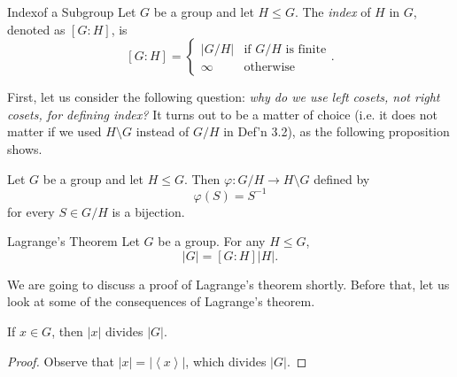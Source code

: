 \documentclass[pmath347]{subfiles}
\begin{document}
    \begin{definition}{Index}{of a Subgroup}
        Let $G$ be a group and let $H\leq G$. The \emph{index} of $H$ in $G$, denoted as $\left[ G:H \right]$, is
        \begin{equation*}
            \left[ G:H \right] = 
            \begin{cases} 
                \left| G /H \right|  & \text{if }G /H \text{ is finite} \\
                \infty & \text{otherwise}
            \end{cases}.
        \end{equation*}
    \end{definition}

    \np First, let us consider the following question: \textit{why do we use left cosets, not right cosets, for defining index?} It turns out to be a matter of choice (i.e. it does not matter if we used $H\setminus G$ instead of $G /H$ in Def'n 3.2), as the following proposition shows.

    \begin{prop}{}
        Let $G$ be a group and let $H\leq G$. Then $\varphi:G /H\to H\setminus G$ defined by
        \begin{equation*}
            \varphi\left( S \right) = S^{-1} 
        \end{equation*}
        for every $S\in G /H$ is a bijection.
    \end{prop}
    
    \begin{theorem}{Lagrange's Theorem}
        Let $G$ be a group. For any $H\leq G$,
        \begin{equation*}
            \left| G \right| = \left[ G:H \right] \left| H \right| .
        \end{equation*}
    \end{theorem}

    \np We are going to discuss a proof of Lagrange's theorem shortly. Before that, let us look at some of the consequences of Lagrange's theorem. 

    \begin{cor}{}
        If $x\in G$, then $\left| x \right| $ divides $\left| G \right|$.
    \end{cor}	

    \begin{proof}
        Observe that $\left| x \right| = \left| \left< x \right>   \right|$, which divides $\left| G \right|$.
    \end{proof}
\end{document}
